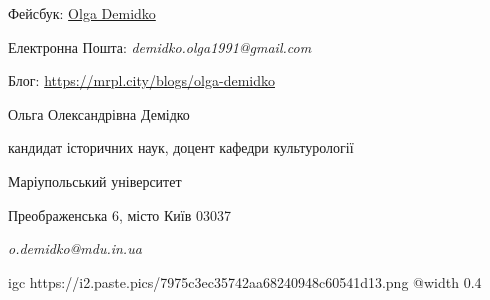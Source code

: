 Фейсбук: \href{https://www.facebook.com/profile.php?id=100009080371413}{Olga Demidko}\par
Електронна Пошта: \textit{demidko.olga1991@gmail.com}\par
Блог: \url{https://mrpl.city/blogs/olga-demidko}\par
\linkDemidkoWorksMDU\par
\linkDemidkoWorksIA\par
\linkDemidkoWorksGoogleScholar\par
Ольга Олександрівна Демідко\par
кандидат історичних наук, доцент кафедри культурології\par
Маріупольський університет\par
Преображенська 6, місто Київ 03037\par
\textit{o.demidko@mdu.in.ua}

\ifcmt
  igc https://i2.paste.pics/7975c3ec35742aa68240948c60541d13.png
	@width 0.4
\fi





% 





